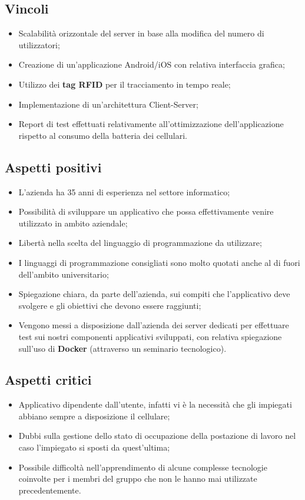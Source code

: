 \subsection{Vincoli}{
\begin{itemize}
\item Scalabilità orizzontale del server in base alla modifica del numero di utilizzatori;
\item Creazione di un'applicazione Android/iOS con relativa interfaccia grafica;
\item Utilizzo dei \textbf{tag RFID} per il tracciamento in tempo reale;
\item Implementazione di un'architettura Client-Server;
\item Report di test effettuati relativamente all'ottimizzazione dell'applicazione rispetto al consumo della
batteria dei cellulari.
\end{itemize}
}

\subsection{Aspetti positivi}{
\begin{itemize}
\item L'azienda ha 35 anni di esperienza nel settore informatico;
\item Possibilità di sviluppare un applicativo che possa effettivamente venire utilizzato in ambito aziendale;
\item Libertà nella scelta del linguaggio di programmazione da utilizzare;
\item I linguaggi di programmazione consigliati sono molto quotati anche al di fuori dell'ambito universitario;
\item Spiegazione chiara, da parte dell'azienda, sui compiti che l'applicativo deve svolgere e gli obiettivi che devono essere raggiunti;
\item Vengono messi a disposizione dall'azienda dei server dedicati per effettuare test sui nostri componenti applicativi sviluppati, con relativa spiegazione sull'uso di \textbf{Docker} (attraverso un seminario tecnologico).
\end{itemize}
}

\subsection{Aspetti critici}{
\begin{itemize}
\item Applicativo dipendente dall'utente, infatti vi è la necessità che gli impiegati abbiano sempre a disposizione il cellulare;
\item Dubbi sulla gestione dello stato di occupazione della postazione di lavoro nel caso l'impiegato si sposti da quest'ultima;
\item Possibile difficoltà nell'apprendimento di alcune complesse tecnologie coinvolte per i membri del gruppo che non le hanno mai utilizzate precedentemente.
\end{itemize}
}

